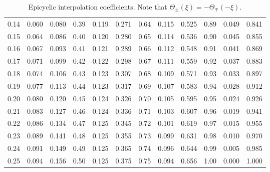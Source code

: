 \begin{table}[!h]
\begin{tabular}{ccc|ccc|ccc|ccc}
  0.14 &   0.060 &   0.080 &   0.39 &   0.119 &   0.271 &   0.64 &   0.115 &   0.525 &   0.89 &   0.049 &   0.841\\
  0.15 &   0.064 &   0.086 &   0.40 &   0.120 &   0.280 &   0.65 &   0.114 &   0.536 &   0.90 &   0.045 &   0.855\\
  0.16 &   0.067 &   0.093 &   0.41 &   0.121 &   0.289 &   0.66 &   0.112 &   0.548 &   0.91 &   0.041 &   0.869\\
  0.17 &   0.071 &   0.099 &   0.42 &   0.122 &   0.298 &   0.67 &   0.111 &   0.559 &   0.92 &   0.037 &   0.883\\
  0.18 &   0.074 &   0.106 &   0.43 &   0.123 &   0.307 &   0.68 &   0.109 &   0.571 &   0.93 &   0.033 &   0.897\\
  0.19 &   0.077 &   0.113 &   0.44 &   0.123 &   0.317 &   0.69 &   0.107 &   0.583 &   0.94 &   0.028 &   0.912\\
  0.20 &   0.080 &   0.120 &   0.45 &   0.124 &   0.326 &   0.70 &   0.105 &   0.595 &   0.95 &   0.024 &   0.926\\
  0.21 &   0.083 &   0.127 &   0.46 &   0.124 &   0.336 &   0.71 &   0.103 &   0.607 &   0.96 &   0.019 &   0.941\\
  0.22 &   0.086 &   0.134 &   0.47 &   0.125 &   0.345 &   0.72 &   0.101 &   0.619 &   0.97 &   0.015 &   0.955\\
  0.23 &   0.089 &   0.141 &   0.48 &   0.125 &   0.355 &   0.73 &   0.099 &   0.631 &   0.98 &   0.010 &   0.970\\
  0.24 &   0.091 &   0.149 &   0.49 &   0.125 &   0.365 &   0.74 &   0.096 &   0.644 &   0.99 &   0.005 &   0.985\\
  0.25 &   0.094 &   0.156 &   0.50 &   0.125 &   0.375 &   0.75 &   0.094 &   0.656 &   1.00 &  0.000 &   1.000\\
\end{tabular}
\caption{Epicyclic interpolation coefficients. Note that $\Theta_\pm (\xi) = - \Theta_\mp (-\xi)$.}\label{vty}
\end{table}

